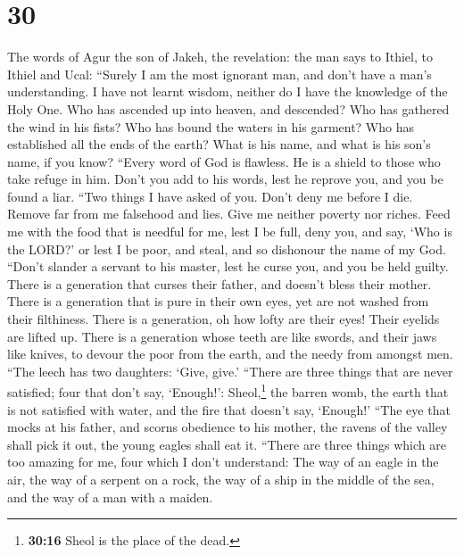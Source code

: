 \hypertarget{section-25}{%
\section{30}\label{section-25}}

 The words of Agur the son of Jakeh, the revelation: the
man says to Ithiel, to Ithiel and Ucal:  ``Surely I am the
most ignorant man, and don't have a man's understanding. 
I have not learnt wisdom, neither do I have the knowledge of the Holy
One.  Who has ascended up into heaven, and descended? Who
has gathered the wind in his fists? Who has bound the waters in his
garment? Who has established all the ends of the earth? What is his
name, and what is his son's name, if you know?  ``Every
word of God is flawless. He is a shield to those who take refuge in him.
 Don't you add to his words, lest he reprove you, and you
be found a liar.  ``Two things I have asked of you. Don't
deny me before I die.  Remove far from me falsehood and
lies. Give me neither poverty nor riches. Feed me with the food that is
needful for me,  lest I be full, deny you, and say, `Who
is the LORD?' or lest I be poor, and steal, and so dishonour the name of
my God.  ``Don't slander a servant to his master, lest he
curse you, and you be held guilty.  There is a generation
that curses their father, and doesn't bless their mother.
 There is a generation that is pure in their own eyes,
yet are not washed from their filthiness.  There is a
generation, oh how lofty are their eyes! Their eyelids are lifted up.
 There is a generation whose teeth are like swords, and
their jaws like knives, to devour the poor from the earth, and the needy
from amongst men.  ``The leech has two daughters: `Give,
give.' ``There are three things that are never satisfied; four that
don't say, `Enough!':  Sheol,\footnote{\textbf{30:16}
  Sheol is the place of the dead.} the barren womb, the earth that is
not satisfied with water, and the fire that doesn't say, `Enough!'
 ``The eye that mocks at his father, and scorns obedience
to his mother, the ravens of the valley shall pick it out, the young
eagles shall eat it.  ``There are three things which are
too amazing for me, four which I don't understand:  The
way of an eagle in the air, the way of a serpent on a rock, the way of a
ship in the middle of the sea, and the way of a man with a maiden.
